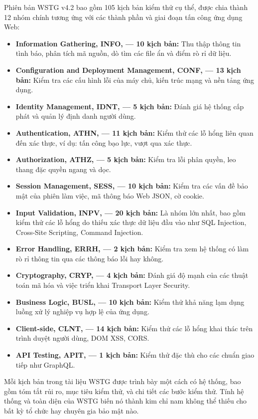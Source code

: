 Phiên bản WSTG v4.2 \cite{owasp2021wstg} bao gồm 105 kịch bản kiểm thử cụ thể, được chia thành 12 nhóm chính tương ứng với các thành phần và giai đoạn tấn công ứng dụng Web:
\begin{itemize}
    \item \textbf{Information Gathering, INFO, --- 10 kịch bản:} Thu thập thông tin tình báo, phân tích mã nguồn, dò tìm các file ẩn và điểm rò rỉ dữ liệu.
    \item \textbf{Configuration and Deployment Management, CONF, --- 13 kịch bản:} Kiểm tra các cấu hình lỗi của máy chủ, kiến trúc mạng và nền tảng ứng dụng.
    \item \textbf{Identity Management, IDNT, --- 5 kịch bản:} Đánh giá hệ thống cấp phát và quản lý định danh người dùng.
    \item \textbf{Authentication, ATHN, --- 11 kịch bản:} Kiểm thử các lỗ hổng liên quan đến xác thực, ví dụ: tấn công bạo lực, vượt qua xác thực.
    \item \textbf{Authorization, ATHZ, --- 5 kịch bản:} Kiểm tra lỗi phân quyền, leo thang đặc quyền ngang và dọc.
    \item \textbf{Session Management, SESS, --- 10 kịch bản:} Kiểm tra các vấn đề bảo mật của phiên làm việc, mã thông báo Web JSON, cờ cookie.
    \item \textbf{Input Validation, INPV, --- 20 kịch bản:} Là nhóm lớn nhất, bao gồm kiểm thử các lỗ hổng do thiếu xác thực dữ liệu đầu vào như SQL Injection, Cross-Site Scripting, Command Injection.
    \item \textbf{Error Handling, ERRH, --- 2 kịch bản:} Kiểm tra xem hệ thống có làm rò rỉ thông tin qua các thông báo lỗi hay không.
    \item \textbf{Cryptography, CRYP, --- 4 kịch bản:} Đánh giá độ mạnh của các thuật toán mã hóa và việc triển khai Transport Layer Security.
    \item \textbf{Business Logic, BUSL, --- 10 kịch bản:} Kiểm thử khả năng lạm dụng luồng xử lý nghiệp vụ hợp lệ của ứng dụng.
    \item \textbf{Client-side, CLNT, --- 14 kịch bản:} Kiểm thử các lỗ hổng khai thác trên trình duyệt người dùng, DOM XSS, CORS.
    \item \textbf{API Testing, APIT, --- 1 kịch bản:} Kiểm thử đặc thù cho các chuẩn giao tiếp như GraphQL.
\end{itemize}

Mỗi kịch bản trong tài liệu WSTG được trình bày một cách có hệ thống, bao gồm tóm tắt rủi ro, mục tiêu kiểm thử, và chi tiết các bước kiểm thử. Tính hệ thống và toàn diện của WSTG biến nó thành kim chỉ nam không thể thiếu cho bất kỳ tổ chức hay chuyên gia bảo mật nào.

